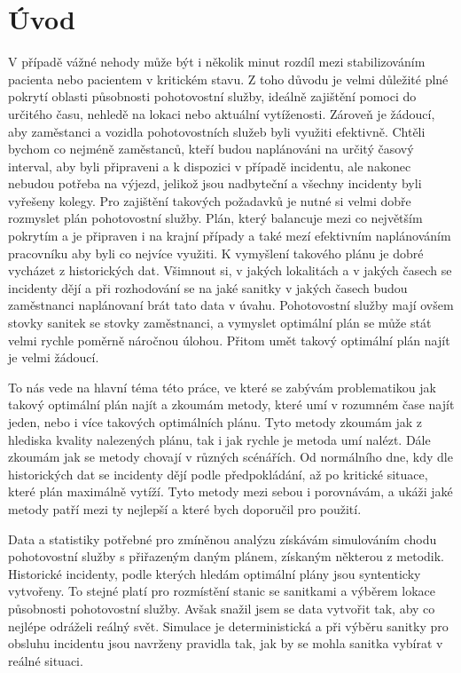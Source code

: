 \chapter*{Úvod}

V případě vážné nehody může být i několik minut rozdíl mezi stabilizováním pacienta nebo pacientem v kritickém stavu.
Z toho důvodu je velmi důležité plné pokrytí oblasti působnosti pohotovostní služby, ideálně zajištění pomoci do určitého času, nehledě na lokaci nebo aktuální vytíženosti.
Zároveň je žádoucí, aby zaměstanci a vozidla pohotovostních služeb byli využiti efektivně.
Chtěli bychom co nejméně zaměstanců, kteří budou naplánováni na určitý časový interval, aby byli připraveni a k dispozici v případě incidentu,
ale nakonec nebudou potřeba na výjezd, jelikož jsou nadbyteční a všechny incidenty byli vyřešeny kolegy.
Pro zajištění takových požadavků je nutné si velmi dobře rozmyslet plán pohotovostní služby.
Plán, který balancuje mezi co největším pokrytím a je připraven i na krajní případy a také mezí efektivním naplánováním pracovníku aby byli co nejvíce využiti.
K vymyšlení takového plánu je dobré vycházet z historických dat.
Všimnout si, v jakých lokalitách a v jakých časech se incidenty dějí a při rozhodování se na jaké sanitky v jakých časech budou
zaměstnanci naplánovaní brát tato data v úvahu.
Pohotovostní služby mají ovšem stovky sanitek se stovky zaměstnanci, a vymyslet optimální plán se může stát velmi rychle poměrně náročnou úlohou.
Přitom umět takový optimální plán najít je velmi žádoucí.

To nás vede na hlavní téma této práce, ve které se zabývám problematikou jak takový optimální plán najít a zkoumám metody,
které umí v rozumném čase najít jeden, nebo i více takových optimálních plánu.
Tyto metody zkoumám jak z hlediska kvality nalezených plánu, tak i jak rychle je metoda umí nalézt.
Dále zkoumám jak se metody chovají v různých scénářích.
Od normálního dne, kdy dle historických dat se incidenty dějí podle předpokládání, až po kritické situace, které plán maximálně vytíží.
Tyto metody mezi sebou i porovnávám, a ukáži jaké metody patří mezi ty nejlepší a které bych doporučil pro použití.

Data a statistiky potřebné pro zmíněnou analýzu získávám simulováním chodu pohotovostní služby s přiřazeným daným plánem, získaným některou z metodik.
Historické incidenty, podle kterých hledám optimální plány jsou syntenticky vytvořeny.
To stejné platí pro rozmístění stanic se sanitkami a výběrem lokace působnosti pohotovostní služby.
Avšak snažil jsem se data vytvořit tak, aby co nejlépe odráželi reálný svět.
Simulace je deterministická a při výběru sanitky pro obsluhu incidentu jsou navrženy pravidla tak, jak by se mohla sanitka vybírat v reálné situaci.


